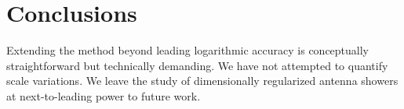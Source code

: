 \section{Conclusions}\label{sec:conclusions}

Extending the method beyond leading logarithmic accuracy is conceptually
straightforward but technically demanding. We have not attempted to
quantify scale variations. We leave the study of dimensionally
regularized antenna showers at next-to-leading power to future work.

